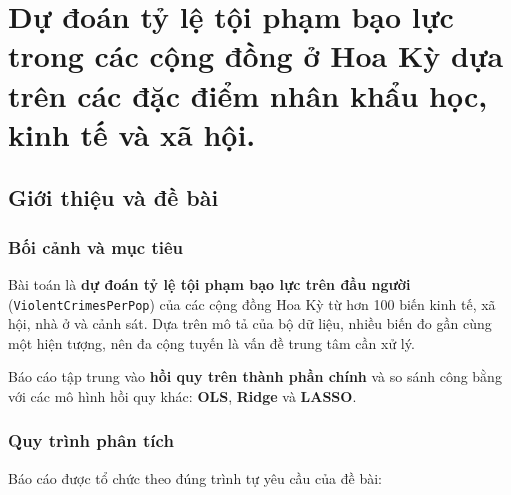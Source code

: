 \section{Dự đoán tỷ lệ tội phạm bạo lực trong các cộng đồng ở Hoa Kỳ dựa trên các đặc điểm nhân khẩu học, kinh tế và xã hội.}

\subsection{Giới thiệu và đề
bài}\label{giux1edbi-thiux1ec7u-vuxe0-ux111ux1ec1-buxe0i}

\subsubsection{Bối cảnh và mục
tiêu}\label{bux1ed1i-cux1ea3nh-vuxe0-mux1ee5c-tiuxeau}

Bài toán là \textbf{dự đoán tỷ lệ tội phạm bạo lực trên đầu người}
(\texttt{ViolentCrimesPerPop}) của các cộng đồng Hoa Kỳ từ hơn 100 biến
kinh tế, xã hội, nhà ở và cảnh sát. Dựa trên mô tả của bộ dữ liệu, nhiều
biến đo gần cùng một hiện tượng, nên đa cộng tuyến là vấn đề trung tâm
cần xử lý.

Báo cáo tập trung vào \textbf{hồi quy trên thành phần chính} và so sánh
công bằng với các mô hình hồi quy khác: \textbf{OLS}, \textbf{Ridge} và
\textbf{LASSO}.

\subsubsection{Quy trình phân tích}\label{quy-truxecnh-phuxe2n-tuxedch}

Báo cáo được tổ chức theo đúng trình tự yêu cầu của đề bài:

